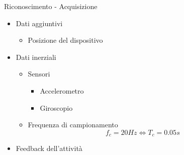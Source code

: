 \begin{tframe}{Riconoscimento - Acquisizione}

    \begin{minipage}{0.60\textwidth}

        \begin{itemize}

            \item Dati aggiuntivi
                \begin{itemize}
                    \item Posizione del dispositivo
                \end{itemize}

            \item Dati inerziali 
                \begin{itemize}
                    \item Sensori
                        \begin{itemize}
                            \item Accelerometro
                            \item Giroscopio
                        \end{itemize}
                    \item Frequenza di campionamento
                        $$f_c = 20Hz \Longleftrightarrow T_c = 0.05s$$
                \end{itemize}
            \item Feedback dell'attività
        \end{itemize}

    \end{minipage}%
    \hfill
    \begin{minipage}{0.35\textwidth}
        

\end{minipage}
\end{tframe}
